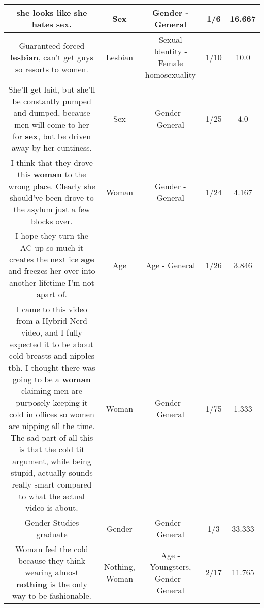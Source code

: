 \documentclass[11pt]{article}
\newlength\mylength
\begin{document}
\begin{center}
\begin{longtable}{|C{.65\mylength}|C{.30\mylength}|C{.12\mylength}|C{.12\mylength}|C{.12\mylength}|}
  \small she looks like she hates \textbf{sex}.\normalsize   & Sex & Gender - General & 1/6 & 16.667 \\  \hline
  \small Guaranteed forced \textbf{lesbian}, can't get guys so resorts to women.\normalsize   & Lesbian & Sexual Identity - Female homosexuality & 1/10 & 10.0 \\  \hline
  \small She'll get laid, but she'll be constantly pumped and dumped, because men will come to her for \textbf{sex}, but be driven away by her cuntiness.\normalsize   & Sex & Gender - General & 1/25 & 4.0 \\  \hline
  \small I think that they drove this \textbf{woman} to the wrong place. Clearly she should've been drove to the asylum just a few blocks over.\normalsize   & Woman & Gender - General & 1/24 & 4.167 \\  \hline
  \small I hope they turn the AC up so much it creates the next ice \textbf{age} and freezes her over into another lifetime I'm not apart of.\normalsize   & Age & Age - General & 1/26 & 3.846 \\  \hline
  \small I came to this video from a Hybrid Nerd video, and I fully expected it to be about cold breasts and nipples tbh. I thought there was going to be a \textbf{woman} claiming men are purposely keeping it cold in offices so women are nipping all the time. The sad part of all this is that the cold tit argument, while being stupid, actually sounds really smart compared to what the actual video is about.\normalsize   & Woman & Gender - General & 1/75 & 1.333 \\  \hline
  \small Gender Studies graduate\normalsize   & Gender & Gender - General & 1/3 & 33.333 \\  \hline
  \small Woman feel the cold because they think wearing almost \textbf{nothing} is the only way to be fashionable.\normalsize   & Nothing, Woman & Age - Youngsters, Gender - General & 2/17 & 11.765 \\  \hline

\end{longtable}
\end{center}
\end{document}
